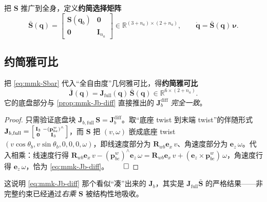把 $\mathbf{S}$ 推广到全身，定义\textbf{约简选择矩阵}
\begin{equation}
  \bar{\mathbf{S}}(\mathbf{q})=\begin{bmatrix}\mathbf{S}(\mathbf{q}_b)&\mathbf{0}\\\mathbf{0}&\mathbf{I}_{n_a}\end{bmatrix}
  \in\mathbb{R}^{(3+n_a)\times(2+n_a)},\qquad
  \dot{\mathbf{q}}=\bar{\mathbf{S}}(\mathbf{q})\,\boldsymbol{\nu}.
  \label{eq:mmk-Sbar}
\end{equation}

\subsection{约简雅可比}
\label{sec:mmk-Jbar}

\begin{theorem}[约简雅可比]\label{thm:mmk-Jbar}
把 \cref{eq:mmk-Sbar} 代入“全自由度”几何雅可比，得\textbf{约简雅可比}
\begin{equation}
  \boxed{\;\bar{\mathbf{J}}(\mathbf{q})=\mathbf{J}_{\text{full}}(\mathbf{q})\,\bar{\mathbf{S}}(\mathbf{q})\in\mathbb{R}^{6\times(2+n_a)}.\;}
  \label{eq:mmk-Jbar}
\end{equation}
它的底盘部分与 \cref{prop:mmk-Jb-diff} 直接推出的 $\mathbf{J}_b^{\text{diff}}$ \emph{完全一致}。
\end{theorem}
\begin{proof}
只需验证底盘块 $\mathbf{J}_{b,\text{full}}\,\mathbf{S}=\mathbf{J}_b^{\text{diff}}$。取“底座 twist 到末端 twist”的伴随形式 $\mathbf{J}_{b,\text{full}}=\begin{bsmallmatrix}\mathbf{I}_3&-(\mathbf{p}_{be}^w)^\wedge\\\mathbf{0}&\mathbf{I}_3\end{bsmallmatrix}$，而 $\mathbf{S}$ 把 $(v,\omega)$ 嵌成底座 twist $(v\cos\theta_b,v\sin\theta_b,0,0,0,\omega)$，即线速度部分为 $\mathbf{R}_{wb}\mathbf{e}_x\,v$、角速度部分为 $\mathbf{e}_z\,\omega$。代入相乘：线速度行得 $\mathbf{R}_{wb}\mathbf{e}_x\,v-(\mathbf{p}_{be}^w)^\wedge\mathbf{e}_z\,\omega=\mathbf{R}_{wb}\mathbf{e}_x\,v+(\mathbf{e}_z\times\mathbf{p}_{be}^w)\,\omega$，角速度行得 $\mathbf{e}_z\,\omega$，恰为 \cref{eq:mmk-Jb-diff}。$\qed$
\end{proof}

\noindent 这说明 \cref{eq:mmk-Jb-diff} 那个看似“凑”出来的 $\mathbf{J}_b$，其实是 $\mathbf{J}_{\text{full}}\bar{\mathbf{S}}$ 的严格结果——非完整约束已经通过\emph{右乘 $\mathbf{S}$} 被结构性地吸收。

